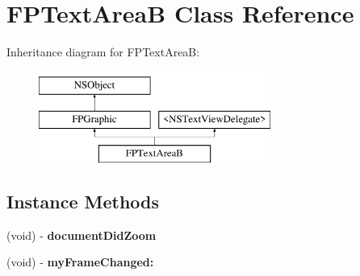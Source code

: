 \hypertarget{interface_f_p_text_area_b}{}\section{F\+P\+Text\+AreaB Class Reference}
\label{interface_f_p_text_area_b}
Inheritance diagram for F\+P\+Text\+AreaB\+:\begin{figure}[H]
\begin{center}
\leavevmode
\includegraphics[height=3.000000cm]{interface_f_p_text_area_b}
\end{center}
\end{figure}
\subsection*{Instance Methods}
\begin{DoxyCompactItemize}
\item 
\mbox{\label{interface_f_p_text_area_b_a6959c558ff47686d220ecceca131b5e4}} 
(void) -\/ {\bfseries document\+Did\+Zoom}
\item 
\mbox{\label{interface_f_p_text_area_b_abdf0eac2cc403149e8465e898394a81b}} 
(void) -\/ {\bfseries my\+Frame\+Changed\+:}
\end{DoxyCompactItemize}
